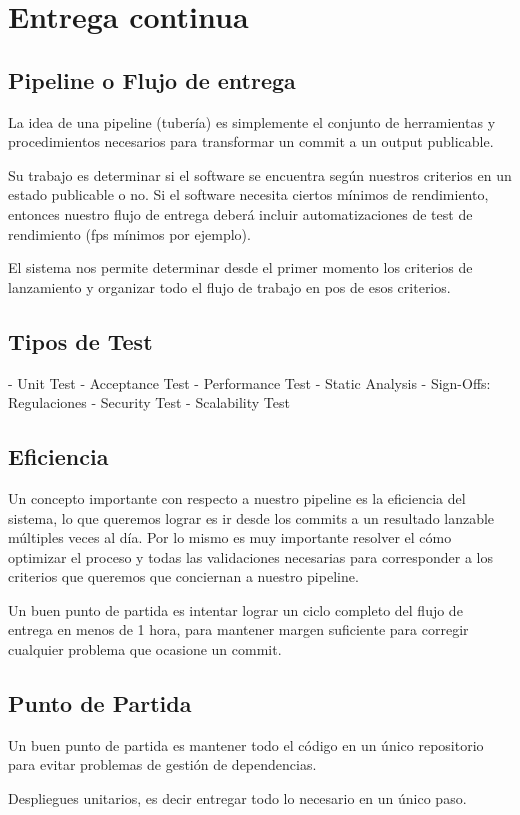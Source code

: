 
\section{Entrega continua}\label{cd:entrega-continua}

\subsection{Pipeline o Flujo de entrega}\label{cd:flujo-de-entrega}

La idea de una pipeline (tubería) es simplemente el conjunto de herramientas y
procedimientos necesarios para transformar un commit a un output publicable.

Su trabajo es determinar si el software se encuentra según nuestros criterios
en un estado publicable o no. Si el software necesita ciertos mínimos de
rendimiento, entonces nuestro flujo de entrega deberá incluir automatizaciones
de test de rendimiento (fps mínimos por ejemplo).

El sistema nos permite determinar desde el primer momento los criterios de
lanzamiento y organizar todo el flujo de trabajo en pos de esos criterios.

\subsection{Tipos de Test}

- Unit Test
- Acceptance Test
- Performance Test
- Static Analysis
- Sign-Offs: Regulaciones
- Security Test
- Scalability Test

\subsection{Eficiencia}

Un concepto importante con respecto a nuestro pipeline es la eficiencia del
sistema, lo que queremos lograr es ir desde los commits a un resultado lanzable
múltiples veces al día. Por lo mismo es muy importante resolver el cómo
optimizar el proceso y todas las validaciones necesarias para corresponder a
los criterios que queremos que conciernan a nuestro pipeline.

Un buen punto de partida es intentar lograr un ciclo completo del flujo de entrega en menos de 1 hora, para mantener margen suficiente para corregir cualquier problema que ocasione un commit.

\subsection{Punto de Partida}

Un buen punto de partida es mantener todo el código en un único repositorio para evitar problemas de gestión de dependencias.

Despliegues unitarios, es decir entregar todo lo necesario en un único paso.




